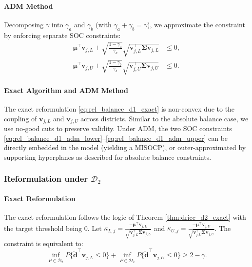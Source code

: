 \documentclass[preprint,12pt,authoryear]{elsarticle}
\begin{document}
\paragraph{ADM Method}
Decomposing $\gamma$ into $\gamma_a$ and $\gamma_b$ (with $\gamma_a + \gamma_b = \gamma$), we approximate the constraint by enforcing separate SOC constraints:
\begin{align}
\boldsymbol{\mu}^\top \mathbf{v}_{j,L} + \sqrt{\frac{1-\gamma_a}{\gamma_a}} \sqrt{\mathbf{v}_{j,L}^\top \boldsymbol{\Sigma} \mathbf{v}_{j,L}} &\leqslant 0, \label{eq:rel_balance_d1_adm_lower} \\
\boldsymbol{\mu}^\top \mathbf{v}_{j,U} + \sqrt{\frac{1-\gamma_b}{\gamma_b}} \sqrt{\mathbf{v}_{j,U}^\top \boldsymbol{\Sigma} \mathbf{v}_{j,U}} &\leqslant 0. \label{eq:rel_balance_d1_adm_upper}
\end{align}

\paragraph{Exact Algorithm and ADM Method}
The exact reformulation \eqref{eq:rel_balance_d1_exact} is non-convex due to the coupling of $\mathbf{v}_{j,L}$ and $\mathbf{v}_{j,U}$ across districts. Similar to the absolute balance case, we use no-good cuts to preserve validity. Under ADM, the two SOC constraints \eqref{eq:rel_balance_d1_adm_lower}--\eqref{eq:rel_balance_d1_adm_upper} can be directly embedded in the model (yielding a MISOCP), or outer-approximated by supporting hyperplanes as described for absolute balance constraints.

\subsubsection{Reformulation under $\mathcal{D}_2$}

\paragraph{Exact Reformulation}
The exact reformulation follows the logic of Theorem \ref{thm:dricc_d2_exact} with the target threshold being 0. Let $\kappa_{L,j} = \frac{-\boldsymbol{\mu}^\top \mathbf{v}_{j,L}}{\sqrt{\mathbf{v}_{j,L}^\top \boldsymbol{\Sigma} \mathbf{v}_{j,L}}}$ and $\kappa_{U,j} = \frac{-\boldsymbol{\mu}^\top \mathbf{v}_{j,U}}{\sqrt{\mathbf{v}_{j,U}^\top \boldsymbol{\Sigma} \mathbf{v}_{j,U}}}$. The constraint is equivalent to:
\begin{equation}
\inf_{P \in \mathcal{D}_2} P \{ \tilde{\mathbf{d}}^\top \mathbf{v}_{j,L} \leqslant 0 \} + \inf_{P \in \mathcal{D}_2} P \{ \tilde{\mathbf{d}}^\top \mathbf{v}_{j,U} \leqslant 0 \} \geqslant 2 - \gamma.
\end{equation}
\end{document}
